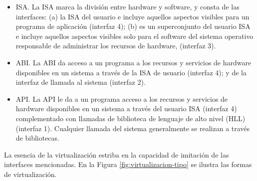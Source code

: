 	
	\begin{itemize}
		\item ISA.  La ISA marca la división entre hardware y software, y consta de las interfaces: (a) la ISA del usuario e incluye aquellos aspectos visibles para un programa de aplicación (interfaz 4); (b)  es un superconjunto del usuario ISA e incluye aquellos aspectos visibles solo para el software del sistema operativo responsable de administrar los recursos de hardware, (interfaz 3).
	
		\item ABI. La ABI da acceso a un programa a los recursos y servicios de hardware disponibles en un sistema a través de la ISA de usuario (interfaz 4); y de la interfaz de llamada al sistema (interfaz 2).
	 
		\item API. La API le da a un programa acceso a los recursos y servicios de hardware disponibles en un sistema a través del usuario ISA (interfaz 4) complementado con llamadas de biblioteca de lenguaje de alto nivel (HLL) (interfaz 1). Cualquier llamada del sistema generalmente se realizan a través de bibliotecas.
	\end{itemize}

 
	
	La esencia de la virtualización estriba en la capacidad de imitación de las interfaces mencionadas. En la Figura \ref{fig:virtualizacion-tipo}   se ilustra las formas de virtualización.   
	
